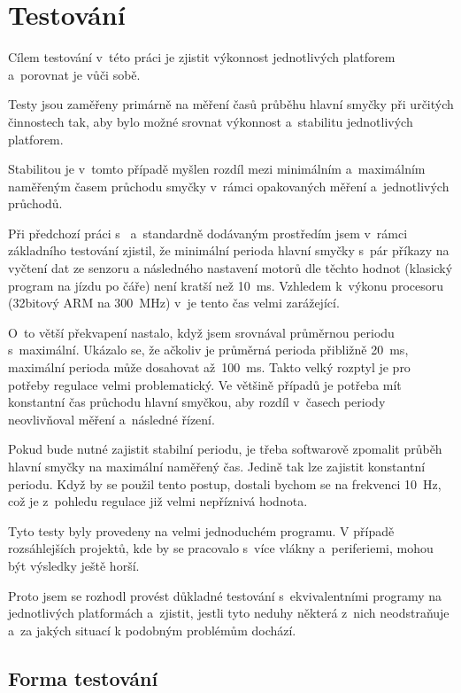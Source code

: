 \chapter{Testování}

Cílem testování v~této práci je zjistit výkonnost jednotlivých platforem a~porovnat je vůči sobě. 

Testy jsou zaměřeny primárně na měření časů průběhu hlavní smyčky při určitých činnostech tak, aby bylo možné srovnat výkonnost a~stabilitu jednotlivých platforem. 

Stabilitou je v~tomto případě myšlen rozdíl mezi minimálním a~maximálním naměřeným časem průchodu smyčky v~rámci opakovaných měření a~jednotlivých průchodů.

Při předchozí práci s~\EVthree{ } a~standardně dodávaným prostředím jsem v~rámci základního testování zjistil, že minimální perioda hlavní smyčky s~pár příkazy na vyčtení dat ze senzoru a následného nastavení motorů dle těchto hodnot (klasický program na jízdu po čáře) není kratší než 10~ms. 
Vzhledem k~výkonu procesoru (32bitový ARM na 300~MHz) v~\EVthree{ }je tento čas velmi zarážející. 

O~to větší překvapení nastalo, když jsem srovnával průměrnou periodu s~maximální. Ukázalo se, že ačkoliv je průměrná perioda přibližně 20~ms, maximální perioda může dosahovat až~100~ms. 
Takto velký rozptyl je pro potřeby regulace velmi problematický. 
Ve většině případů je potřeba mít konstantní čas průchodu hlavní smyčkou, aby rozdíl v~časech periody neovlivňoval měření a~následné řízení. 

Pokud bude nutné zajistit stabilní periodu, je třeba softwarově zpomalit průběh hlavní smyčky na maximální naměřený čas. 
Jedině tak lze zajistit konstantní periodu. 
Když by se použil tento postup, dostali bychom se na frekvenci 10~Hz, což je z~pohledu regulace již velmi nepříznivá hodnota.

Tyto testy byly provedeny na velmi jednoduchém programu. 
V případě rozsáhlejších projektů, kde by se pracovalo s~více vlákny a~periferiemi, mohou být výsledky ještě horší.

Proto jsem se rozhodl provést důkladné testování s~ekvivalentními programy na jednotlivých platformách a~zjistit, jestli tyto neduhy některá z~nich neodstraňuje a~za jakých situací k podobným problémům dochází.

\section{Forma testování}

